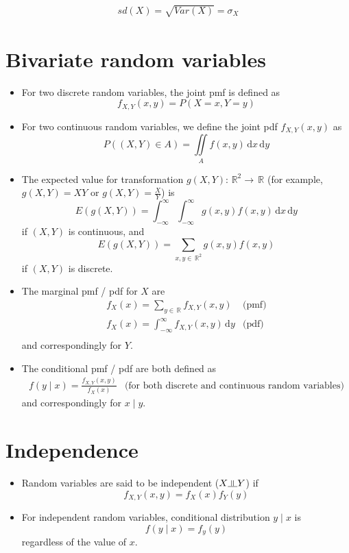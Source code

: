 \documentclass[10pt, twoside, a4paper]{book}
\newcommand{\ud}{\,\mathrm{d}}
\newcommand{\ureal}{\,\mathbb{R}}
\newcommand{\indep}{\rotatebox[origin=c]{90}{$\models$}}
\theoremstyle{definition}
\begin{document}
\begin{equation*}
\renewcommand{\arraystretch}{1.6}
\begin{array}{ll}
sd(X) = \sqrt{Var(X)} = \sigma_X
\end{array}
\end{equation*}

\section{Bivariate random variables}
\begin{itemize}
  \item For two discrete random variables, the joint pmf is defined as
  $$f_{X,Y}(x,y)=P(X=x, Y=y)$$
  \item For two continuous random variables, we define the joint pdf
  $f_{X,Y}(x,y)$ as
  $$P((X,Y) \in A) = \iint\limits_A f(x,y) \ud x \ud y$$
  \item The expected value for transformation
$g(X,Y) : \ureal^2 \to \ureal$ (for example, \\ $g(X,Y) = XY$ or
$g(X,Y) =
\frac{X}{Y}$) is
$$E(g(X,Y)) = \int_{-\infty}^{\infty} \int_{-\infty}^{\infty} g(x,y)f(x,y) \ud
x \ud y$$
if $(X,Y)$ is continuous, and
$$E(g(X,Y)) = \sum_{x,y \in \ureal^2} g(x,y)f(x,y)$$
if $(X,Y)$ is discrete.
\item The marginal pmf / pdf for $X$ are
\begin{equation*}
\renewcommand{\arraystretch}{1.6}
\begin{array}{ll}
f_X(x) = \sum_{y \in \ureal} f_{X,Y}(x,y) & \text{(pmf)} \\
f_X(x) = \int_{-\infty}^{\infty} f_{X,Y}(x,y) \ud y & \text{(pdf)} \\
\end{array}
\end{equation*}
and correspondingly for $Y$.
\item The conditional pmf / pdf are both defined as
\begin{equation*}
\renewcommand{\arraystretch}{1.6}
\begin{array}{ll}
f(y \mid x)  = \frac{f_{X,Y}(x,y)}{f_X(x)} & \text{(for both discrete and
continuous random variables)}
\end{array}
\end{equation*}
and correspondingly for $x \mid y$.
\end{itemize}
\section{Independence}
\begin{itemize}
  \item Random variables are said to be independent ($X \indep Y$) if
  $$f_{X,Y}(x,y) = f_X(x)f_Y(y)$$
  \item For independent random variables, conditional distribution $y \mid x$ is 
  $$f(y \mid x) = f_y(y)$$
  regardless of the value of $x$.
\end{itemize}
\end{document}
